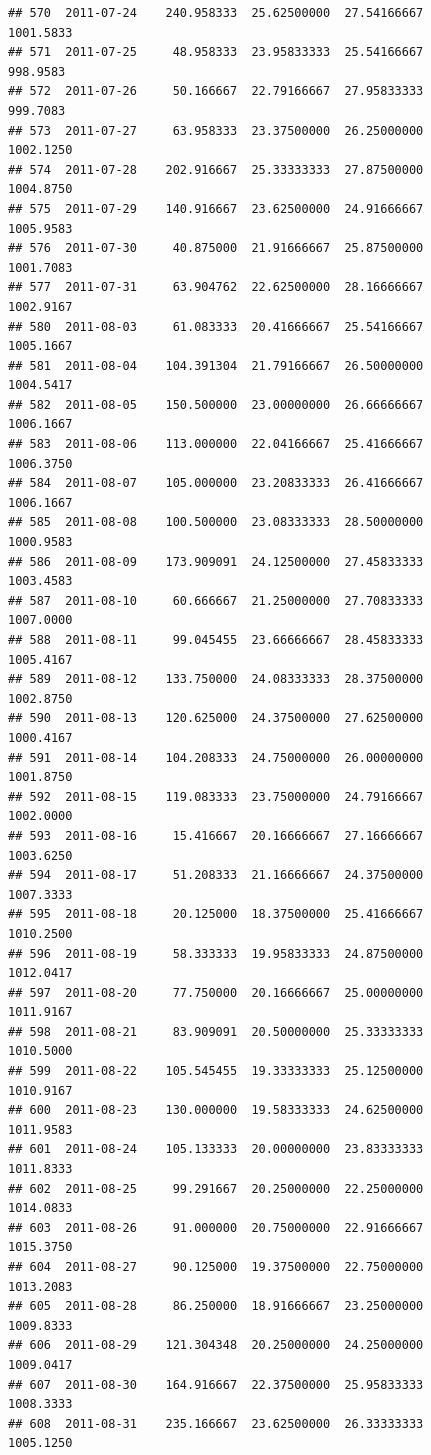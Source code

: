 \documentclass[
]{article}
\begin{document}
\begin{verbatim}
## 570  2011-07-24    240.958333  25.62500000  27.54166667    1001.5833
## 571  2011-07-25     48.958333  23.95833333  25.54166667     998.9583
## 572  2011-07-26     50.166667  22.79166667  27.95833333     999.7083
## 573  2011-07-27     63.958333  23.37500000  26.25000000    1002.1250
## 574  2011-07-28    202.916667  25.33333333  27.87500000    1004.8750
## 575  2011-07-29    140.916667  23.62500000  24.91666667    1005.9583
## 576  2011-07-30     40.875000  21.91666667  25.87500000    1001.7083
## 577  2011-07-31     63.904762  22.62500000  28.16666667    1002.9167
## 580  2011-08-03     61.083333  20.41666667  25.54166667    1005.1667
## 581  2011-08-04    104.391304  21.79166667  26.50000000    1004.5417
## 582  2011-08-05    150.500000  23.00000000  26.66666667    1006.1667
## 583  2011-08-06    113.000000  22.04166667  25.41666667    1006.3750
## 584  2011-08-07    105.000000  23.20833333  26.41666667    1006.1667
## 585  2011-08-08    100.500000  23.08333333  28.50000000    1000.9583
## 586  2011-08-09    173.909091  24.12500000  27.45833333    1003.4583
## 587  2011-08-10     60.666667  21.25000000  27.70833333    1007.0000
## 588  2011-08-11     99.045455  23.66666667  28.45833333    1005.4167
## 589  2011-08-12    133.750000  24.08333333  28.37500000    1002.8750
## 590  2011-08-13    120.625000  24.37500000  27.62500000    1000.4167
## 591  2011-08-14    104.208333  24.75000000  26.00000000    1001.8750
## 592  2011-08-15    119.083333  23.75000000  24.79166667    1002.0000
## 593  2011-08-16     15.416667  20.16666667  27.16666667    1003.6250
## 594  2011-08-17     51.208333  21.16666667  24.37500000    1007.3333
## 595  2011-08-18     20.125000  18.37500000  25.41666667    1010.2500
## 596  2011-08-19     58.333333  19.95833333  24.87500000    1012.0417
## 597  2011-08-20     77.750000  20.16666667  25.00000000    1011.9167
## 598  2011-08-21     83.909091  20.50000000  25.33333333    1010.5000
## 599  2011-08-22    105.545455  19.33333333  25.12500000    1010.9167
## 600  2011-08-23    130.000000  19.58333333  24.62500000    1011.9583
## 601  2011-08-24    105.133333  20.00000000  23.83333333    1011.8333
## 602  2011-08-25     99.291667  20.25000000  22.25000000    1014.0833
## 603  2011-08-26     91.000000  20.75000000  22.91666667    1015.3750
## 604  2011-08-27     90.125000  19.37500000  22.75000000    1013.2083
## 605  2011-08-28     86.250000  18.91666667  23.25000000    1009.8333
## 606  2011-08-29    121.304348  20.25000000  24.25000000    1009.0417
## 607  2011-08-30    164.916667  22.37500000  25.95833333    1008.3333
## 608  2011-08-31    235.166667  23.62500000  26.33333333    1005.1250

\end{verbatim}
\end{document}

